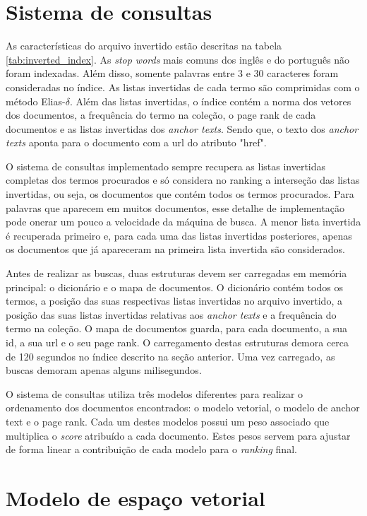 \documentclass{article}
\begin{document}
\section{Sistema de consultas}

As características do arquivo invertido estão descritas na 
tabela \ref{tab:inverted_index}. As \textit{stop words} mais comuns dos inglês e do 
português não foram indexadas. Além disso, somente palavras entre 3 e 30 caracteres
foram consideradas no índice. As listas invertidas de cada termo são comprimidas com
o método Elias-$ \delta $. Além das listas invertidas, o índice contém a norma dos vetores
dos documentos, a frequência do termo na coleção, o page rank de cada documentos 
e as listas invertidas dos \textit{anchor texts}. Sendo que, o texto dos \textit{anchor texts} 
aponta para o documento com a url do atributo "href".

O sistema de consultas implementado sempre recupera as listas invertidas completas dos termos
procurados e só considera no ranking a interseção das listas invertidas, ou seja, os documentos
que contém todos os termos procurados. Para palavras que aparecem em muitos documentos, esse
detalhe de implementação pode onerar um pouco a velocidade da máquina de busca. A menor lista 
invertida é recuperada primeiro e, para cada uma das listas invertidas posteriores, apenas os
documentos que já apareceram na primeira lista invertida são considerados. 

Antes de realizar as buscas, duas estruturas devem ser carregadas em memória principal: 
o dicionário e o mapa de documentos. O dicionário contém todos os termos, a posição das
suas respectivas listas invertidas no arquivo invertido, a posição das suas listas invertidas
relativas aos \textit{anchor texts} e a frequência do termo na coleção. O mapa de documentos guarda, 
para cada documento, a sua id, a sua url e o seu page rank. O carregamento destas estruturas 
demora cerca de 120 segundos no índice descrito na seção anterior. Uma vez carregado, as buscas
demoram apenas alguns milisegundos.

O sistema de consultas utiliza três modelos diferentes para realizar o ordenamento dos documentos
encontrados: o modelo vetorial, o modelo de anchor text e o page rank. Cada um destes modelos
possui um peso associado que multiplica o \textit{score} atribuído a cada documento. Estes pesos
servem para ajustar de forma linear a contribuição de cada modelo para o \textit{ranking} final.

\section{Modelo de espaço vetorial}
\end{document}
